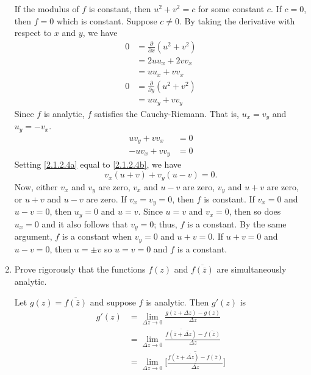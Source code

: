 \begin{enumerate}
  If the modulus of \(f\) is constant, then \(u^2 + v^2 = c\) for some constant
  \(c\).
  If \(c = 0\), then \(f = 0\) which is constant.
  Suppose \(c\neq 0\).
  By taking the derivative with respect to \(x\) and \(y\), we have
  \begin{align*}
    0 & = \frac{\partial}{\partial x}(u^2 + v^2)\\
      & = 2uu_x + 2vv_x\\
      & = uu_x + vv_x\\
    0 & = \frac{\partial}{\partial y}(u^2 + v^2)\\
      & = uu_y + vv_y
  \end{align*}
  Since \(f\) is analytic, \(f\) satisfies the Cauchy-Riemann.
  That is, \(u_x = v_y\) and \(u_y = -v_x\).
  \begin{subequations}
    \begin{align}
      uv_y + vv_x & = 0\label{2.1.2.4a}\\
      -uv_x + vv_y & = 0\label{2.1.2.4b}
    \end{align}
  \end{subequations}
  Setting \cref{2.1.2.4a} equal to \cref{2.1.2.4b}, we have
  \[
  v_x(u + v) + v_y(u - v) = 0.
  \]
  Now, either \(v_x\) and \(v_y\) are zero, \(v_x\) and \(u - v\) are zero,
  \(v_y\) and \(u + v\) are zero, or \(u + v\) and \(u - v\) are zero.
  If \(v_x = v_y = 0\), then \(f\) is constant.
  If \(v_x = 0\) and \(u - v = 0\), then \(u_y = 0\) and \(u = v\).
  Since \(u = v\) and \(v_x = 0\), then so does \(u_x = 0\) and it also follows
  that \(v_y = 0\); thus, \(f\) is a constant.
  By the same argument, \(f\) is a constant when \(v_y = 0\) and \(u + v = 0\).
  If \(u + v = 0\) and \(u - v = 0\), then \(u = \pm v\) so \(u = v = 0\) and
  \(f\) is a constant.
\item
  Prove rigorously that the functions \(f(z)\) and \(\overline{f(\bar{z})}\)
  are simultaneously analytic.
  \par\smallskip
  Let \(g(z) = \overline{f(\bar{z})}\) and suppose \(f\) is analytic.
  Then \(g'(z)\)  is
  \begin{align*}
    g'(z) & = \lim_{\Delta z\to 0}\frac{g(z + \Delta z) - g(z)}{\Delta z}\\
          & = \lim_{\Delta z\to 0}
            \frac{\overline{f(\bar{z} + \overline{\Delta z})} -
            \overline{f(\bar{z})}}{\Delta z}\\
          & = \lim_{\Delta z\to 0}\biggl[
            \overline{\frac{f(\bar{z} + \overline{\Delta z}) - f(\bar{z})}
            {\overline{\Delta z}}}\biggr]\\

\end{align*}
\end{enumerate}
